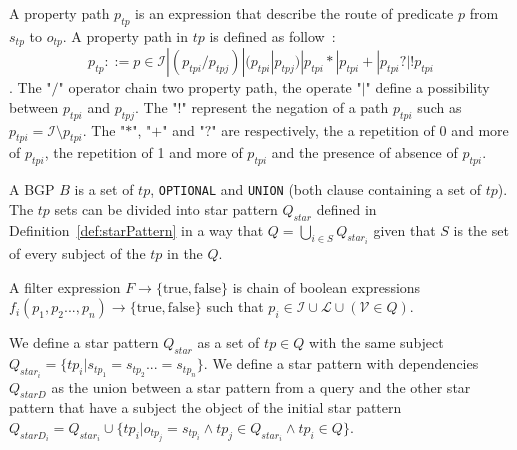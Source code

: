 \begin{definition}\label{def:propertyPath}
   A property path $p_{tp}$ is an expression that describe the route of predicate $p$ from $s_{tp}$ to $o_{tp}$.
   A property path in $tp$ is defined as follow~:
   \begin{equation}
    p_{tp} ::= p \in \mathcal{I} | (p_{tpi}/p_{tpj}) | (p_{tpi}|p_{tpj}) | p_{tpi}* | p_{tpi}+ | p_{tpi}? | !p_{tpi}
   \end{equation}.
   The "$/$" operator chain two property path, the operate "$|$" define a possibility between $p_{tpi}$ and $p_{tpj}$.
   The "$!$" represent the negation of a path $p_{tpi}$ such as $p_{tpi} = \mathcal{I} \setminus p_{tpi}$.
   The "$*$", "$+$" and "$?$" are respectively, the a repetition of 0 and more of $p_{tpi}$, 
   the repetition of 1 and more of $p_{tpi}$ and the presence of absence of $p_{tpi}$.
\end{definition}

\begin{definition}[BGP]\label{def:bgp}
 A BGP $B$ is a set of $tp$, \texttt{OPTIONAL} and \texttt{UNION} (both clause containing a set of $tp$).
 The $tp$ sets can be divided into star pattern $Q_{star}$ defined in Definition~\ref{def:starPattern} in a way 
 that $Q = \bigcup_{i\in S} Q_{star_i}$ given that $S$ is the set of every subject of the $tp$ in the $Q$.
\end{definition}

\begin{definition}\label{def:filterExpression}
    A filter expression $F \rightarrow \{\mathrm{true}, \mathrm{false}\}$ is chain of boolean expressions $f_i(p_1, p_2...,p_n) \rightarrow \{\mathrm{true}, \mathrm{false}\}$ such that 
    $p_i \in \mathcal{I} \cup \mathcal{L} \cup (\mathcal{V}\in Q)$.
\end{definition}

\begin{definition}\label{def:starPattern}
We define a star pattern $Q_{star}$ as a set of $tp \in Q$ with the same subject $Q_{star_i} = \{ tp_i| s_{tp_1} = s_{tp_2} ... = s_{tp_n}\}$.
We define a star pattern with dependencies $Q_{starD}$ as the union between a star pattern from a query and the other star pattern that have a subject
the object of the initial star pattern $Q_{starD_i} = Q_{star_i} \cup \{tp_i| o_{tp_j} = s_{tp_i} \land tp_j \in Q_{star_i} \land tp_i \in Q \}$.
\end{definition}

